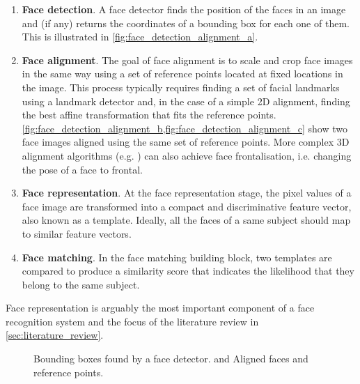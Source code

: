\documentclass[conference]{IEEEtran}
\begin{document}
\begin{enumerate}
    \item \textbf{Face detection}. A face detector finds the position of the faces in an image and (if any) returns the coordinates of a bounding box for each one of them. This is illustrated in \cref{fig:face_detection_alignment_a}.
    \item \textbf{Face alignment}. The goal of face alignment is to scale and crop face images in the same way using a set of reference points located at fixed locations in the image. This process typically requires finding a set of facial landmarks using a landmark detector and, in the case of a simple 2D alignment, finding the best affine transformation that fits the reference points. \cref{fig:face_detection_alignment_b,fig:face_detection_alignment_c} show two face images aligned using the same set of reference points. More complex 3D alignment algorithms (e.g. \cite{hassner2015effective}) can also achieve face frontalisation, i.e. changing the pose of a face to frontal.
    \item \textbf{Face representation}. At the face representation stage, the pixel values of a face image are transformed into a compact and discriminative feature vector, also known as a template. Ideally, all the faces of a same subject should map to similar feature vectors.
    \item \textbf{Face matching}. In the face matching building block, two templates are compared to produce a similarity score that indicates the likelihood that they belong to the same subject.
\end{enumerate}

Face representation is arguably the most important component of a face recognition system and the focus of the literature review in \cref{sec:literature_review}.

\newsavebox{\largestimage}\begin{figure}[b]
    \centering
    \hspace*{\fill}
    \subcaptionbox{\label{fig:face_detection_alignment_a}}{\usebox{\largestimage}}
    \hspace*{\fill}
    \hspace*{\fill}
    \caption{ Bounding boxes found by a face detector.  and  Aligned faces and reference points.}
    \label{fig:face_detection_alignment}
\end{figure}
\end{document}
